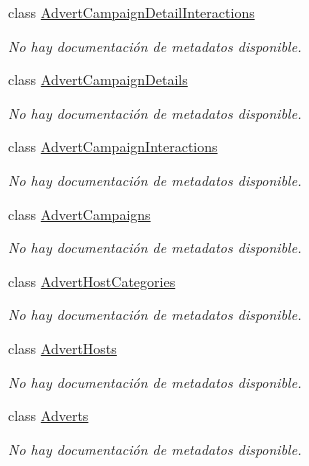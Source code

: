 \begin{DoxyCompactItemize}
class \hyperlink{class_microsoft_1_1_samples_1_1_kinect_1_1_basic_interactions_1_1_advert_campaign_detail_interactions}{Advert\-Campaign\-Detail\-Interactions}
\begin{DoxyCompactList}\small\item\em No hay documentación de metadatos disponible. \end{DoxyCompactList}\item 
class \hyperlink{class_microsoft_1_1_samples_1_1_kinect_1_1_basic_interactions_1_1_advert_campaign_details}{Advert\-Campaign\-Details}
\begin{DoxyCompactList}\small\item\em No hay documentación de metadatos disponible. \end{DoxyCompactList}\item 
class \hyperlink{class_microsoft_1_1_samples_1_1_kinect_1_1_basic_interactions_1_1_advert_campaign_interactions}{Advert\-Campaign\-Interactions}
\begin{DoxyCompactList}\small\item\em No hay documentación de metadatos disponible. \end{DoxyCompactList}\item 
class \hyperlink{class_microsoft_1_1_samples_1_1_kinect_1_1_basic_interactions_1_1_advert_campaigns}{Advert\-Campaigns}
\begin{DoxyCompactList}\small\item\em No hay documentación de metadatos disponible. \end{DoxyCompactList}\item 
class \hyperlink{class_microsoft_1_1_samples_1_1_kinect_1_1_basic_interactions_1_1_advert_host_categories}{Advert\-Host\-Categories}
\begin{DoxyCompactList}\small\item\em No hay documentación de metadatos disponible. \end{DoxyCompactList}\item 
class \hyperlink{class_microsoft_1_1_samples_1_1_kinect_1_1_basic_interactions_1_1_advert_hosts}{Advert\-Hosts}
\begin{DoxyCompactList}\small\item\em No hay documentación de metadatos disponible. \end{DoxyCompactList}\item 
class \hyperlink{class_microsoft_1_1_samples_1_1_kinect_1_1_basic_interactions_1_1_adverts}{Adverts}
\begin{DoxyCompactList}\small\item\em No hay documentación de metadatos disponible. \end{DoxyCompactList}\item 

\end{DoxyCompactItemize}
